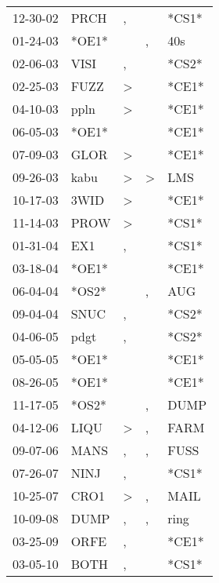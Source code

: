 \begin{supertabular}{lllll}
 12-30-02 &   PRCH &             , &               &  *CS1* \\
 01-24-03 &  *OE1* &               &             , &    40s \\
 02-06-03 &   VISI &             , &               &  *CS2* \\
 02-25-03 &   FUZZ &  \textgreater &               &  *CE1* \\
 04-10-03 &   ppln &  \textgreater &               &  *CE1* \\
 06-05-03 &  *OE1* &               &               &  *CE1* \\
 07-09-03 &   GLOR &  \textgreater &               &  *CE1* \\
 09-26-03 &   kabu &  \textgreater &  \textgreater &    LMS \\
 10-17-03 &   3WID &  \textgreater &               &  *CE1* \\
 11-14-03 &   PROW &  \textgreater &               &  *CS1* \\
 01-31-04 &    EX1 &             , &               &  *CS1* \\
 03-18-04 &  *OE1* &               &               &  *CE1* \\
 06-04-04 &  *OS2* &               &             , &    AUG \\
 09-04-04 &   SNUC &             , &               &  *CS2* \\
 04-06-05 &   pdgt &             , &               &  *CS2* \\
 05-05-05 &  *OE1* &               &               &  *CE1* \\
 08-26-05 &  *OE1* &               &               &  *CE1* \\
 11-17-05 &  *OS2* &               &             , &   DUMP \\
 04-12-06 &   LIQU &  \textgreater &             , &   FARM \\
 09-07-06 &   MANS &             , &             , &   FUSS \\
 07-26-07 &   NINJ &             , &               &  *CS1* \\
 10-25-07 &   CRO1 &  \textgreater &             , &   MAIL \\
 10-09-08 &   DUMP &             , &             , &   ring \\
 03-25-09 &   ORFE &             , &               &  *CE1* \\
 03-05-10 &   BOTH &             , &               &  *CS1* \\

\end{supertabular}
